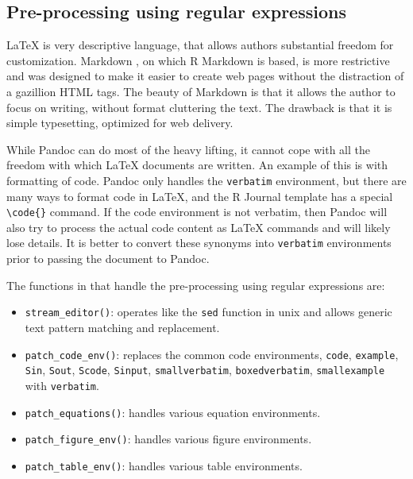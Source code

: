 \subsection{Pre-processing using regular expressions}\label{pre-processing-using-regular-expressions}

LaTeX is very descriptive language, that allows authors substantial freedom for customization. Markdown \citep{markdown}, on which R Markdown is based, is more restrictive and was designed to make it easier to create web pages without the distraction of a gazillion HTML tags. The beauty of Markdown is that it allows the author to focus on writing, without format cluttering the text. The drawback is that it is simple typesetting, optimized for web delivery.

While Pandoc can do most of the heavy lifting, it cannot cope with all the freedom with which LaTeX documents are written. An example of this is with formatting of code. Pandoc only handles the \texttt{verbatim} environment, but there are many ways to format code in LaTeX, and the R Journal template has a special \texttt{\textbackslash{}code\{\}} command. If the code environment is not verbatim, then Pandoc will also try to process the actual code content as LaTeX commands and will likely lose details. It is better to convert these synonyms into \texttt{verbatim} environments prior to passing the document to Pandoc.

The functions in  that handle the pre-processing using regular expressions are:

\begin{itemize}
\tightlist
\item
  \texttt{stream\_editor()}: operates like the \texttt{sed} function in unix \citep{unix} and allows generic text pattern matching and replacement.
\item
  \texttt{patch\_code\_env()}: replaces the common code environments, \texttt{code}, \texttt{example}, \texttt{Sin}, \texttt{Sout}, \texttt{Scode}, \texttt{Sinput}, \texttt{smallverbatim}, \texttt{boxedverbatim}, \texttt{smallexample} with \texttt{verbatim}.
\item
  \texttt{patch\_equations()}: handles various equation environments.
\item
  \texttt{patch\_figure\_env()}: handles various figure environments.
\item
  \texttt{patch\_table\_env()}: handles various table environments.
\end{itemize}

